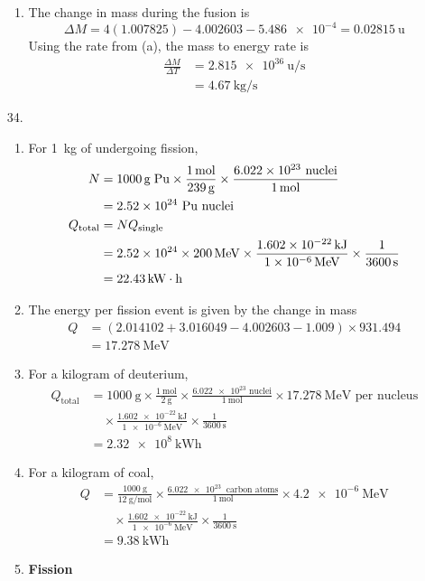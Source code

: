 \documentclass{homework}
\begin{document}
\begin{enumerate}
\begin{enumerate}
			\item The change in mass during the fusion is
				\[ \Delta M = 4(1.007825) - 4.002603 - \num{5.486e-4} = \SI{0.02815}{\amu} \]
				Using the rate from (a), the mass to energy rate is
				\begin{align*}
					\frac{\Delta M}{\Delta T} & = \SI{2.815e36}{\amu\per\s} \\
						& = \SI{4.67}{\kg\per\s}
				\end{align*}
		\end{enumerate}
		\item[34.] \begin{enumerate}
			\item For \SI{1}{\kg} of  undergoing fission, \begin{align*}
				N & = \SI{1000}{\g \; \ce{Pu}} \times \frac{\SI{1}{\mol}}{\SI{239}{\g}}
					\times \frac{\num{6.022e23} \text{ nuclei}}{\SI{1}{\mol}} \\
					& = \num{2.52e24} \text{ Pu nuclei} \\
				Q_\mathrm{total} & = N Q_\mathrm{single} \\
				& = \num{2.52e24} \times \SI{200}{\MeV} \times \frac{ \SI{1.602e-22}{\kJ} }{ \SI{1e-6}{\MeV}} \times \frac{1}{\SI{3600}{\s}} \\
					& = \SI{22.43}{\kW \hour}
			\end{align*}
			\item The energy per fission event is given by the change in mass \begin{align*}
				Q & = \left( 2.014102 + 3.016049 - 4.002603 - 1.009\right) \times 931.494 \\
					& = \SI{17.278}{\MeV}
			\end{align*}
			\item For a kilogram of deuterium, \begin{align*}
				Q_\mathrm{total}  & = \SI{1000}{\g} \times \frac{\SI{1}{\mol}}{\SI{2}{\g}} \times \frac{ \num{6.022e23} \text{ nuclei} }{ \SI{1}{\mol} } \times \SI{17.278}{\MeV} \text{ per nucleus} \\
					& \quad \times \frac{ \SI{1.602e-22}{\kJ} }{ \SI{1e-6}{\MeV}} \times \frac{1}{\SI{3600}{\s}} \\
					& = \SI{2.32e8}{\kWh}
			\end{align*}
			\item For a kilogram of coal, \begin{align*}
				Q & = \frac{\SI{1000}{\g}}{\SI{12}{\g\per\mol}} \times \frac{\SI{6.022e23}{\text{ carbon atoms}}}{\SI{1}{\mol}} \times \SI{4.2e-6}{\MeV} \\
				& \quad \times \frac{ \SI{1.602e-22}{\kJ} }{ \SI{1e-6}{\MeV}} \times \frac{1}{\SI{3600}{\s}}\\
				& = \SI{9.38}{\kWh}
			\end{align*}
			\item \textbf{Fission}
					

\end{enumerate}
\end{enumerate}
\end{document}

